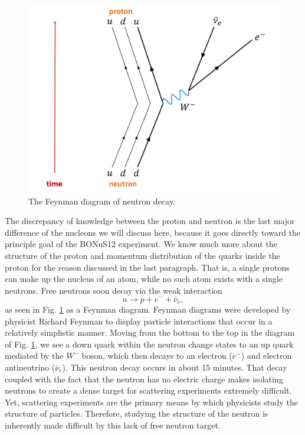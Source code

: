 \begin{figure}[h!]
	\centering
	\includegraphics[width=0.6\linewidth]{figures/neutron_decay.png}
	\caption{The Feynman diagram of neutron decay.}
	\label{fig:neutron_decay}
\end{figure}

The discrepancy of knowledge between the proton and neutron is the last major difference of the nucleons we will discuss here, because it goes directly toward the principle goal of the BONuS12 experiment. We know much more about the structure of the proton and momentum distribution of the quarks inside the proton for the reason discussed in the last paragraph. That is, a single protons can make up the nucleus of an atom, while no such atom exists with a single neutrons. Free neutrons soon decay via the weak interaction
\begin{equation}
n \longrightarrow p + e^{-} + \bar{\nu}_{e},
\end{equation}
as seen in Fig. \ref{fig:neutron_decay} as a Feynman diagram. Feynman diagrams were developed by physicist Richard Feynman to display particle interactions that occur in a relatively simplistic manner. Moving from the bottom to the top in the diagram of Fig. \ref{fig:neutron_decay}, we see a down quark within the neutron change states to an up quark mediated by the $W^-$ boson, which then decays to an electron ($e^-$) and electron antineutrino ($\bar{\nu}_{e}$). This neutron decay occurs in about 15 minutes. That decay coupled with the fact that the neutron has no electric charge makes isolating neutrons to create a dense target for scattering experiments extremely difficult. Yet, scattering experiments are the primary means by which physicists study the structure of particles. Therefore, studying the structure of the neutron is inherently made difficult by this lack of free neutron target.

